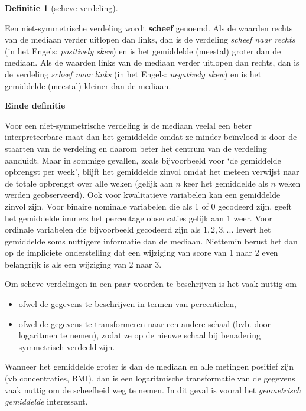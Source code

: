 \documentclass[
  12pt,dutch,coursenotes]{book}
\providecommand{\tightlist}{%
  \setlength{\itemsep}{0pt}\setlength{\parskip}{0pt}}
\theoremstyle{definition}
\newtheorem{definition}{Definitie}[chapter]
\theoremstyle{definition}
\theoremstyle{definition}
\theoremstyle{remark}
\begin{document}
\begin{definition}[scheve verdeling]
\protect\hypertarget{def:unnamed-chunk-98}{}{\label{def:unnamed-chunk-98} \iffalse (scheve verdeling) \fi{} }
\end{definition}
Een niet-symmetrische verdeling wordt \textbf{scheef} genoemd. Als de
waarden rechts van de mediaan verder uitlopen dan links, dan is de verdeling
\emph{scheef naar rechts} (in het Engels: \emph{positively skew}) en is
het gemiddelde (meestal) groter dan de mediaan. Als de waarden links van de
mediaan verder uitlopen dan rechts, dan is de verdeling \emph{scheef naar
links} (in het Engels: \emph{negatively skew}) en is het gemiddelde
(meestal) kleiner dan de mediaan.

\textbf{Einde definitie}

Voor een niet-symmetrische verdeling is de mediaan veelal een beter
interpreteerbare maat dan het gemiddelde omdat ze minder beïnvloed is
door de staarten van de verdeling en daarom beter het centrum van de
verdeling aanduidt. Maar in sommige gevallen, zoals bijvoorbeeld voor `de
gemiddelde opbrengst per week', blijft het gemiddelde zinvol omdat het
meteen verwijst naar de totale opbrengst over alle weken (gelijk aan \(n\)
keer het gemiddelde als \(n\) weken werden geobserveerd). Ook voor
kwalitatieve variabelen kan een gemiddelde zinvol zijn. Voor binaire
nominale variabelen die als 1 of 0 gecodeerd zijn, geeft het gemiddelde
immers het percentage observaties gelijk aan 1 weer. Voor ordinale
variabelen die bijvoorbeeld gecodeerd zijn als \(1, 2, 3, ...\) levert het
gemiddelde soms nuttigere informatie dan de mediaan. Niettemin berust het
dan op de impliciete onderstelling dat een wijziging van score van 1 naar 2
even belangrijk is als een wijziging van 2 naar 3.

Om scheve verdelingen in een paar woorden te beschrijven is het vaak nuttig
om

\begin{itemize}
\tightlist
\item
  ofwel de gegevens te beschrijven in termen van percentielen,
\item
  ofwel de gegevens te transformeren naar een andere schaal (bvb. door
  logaritmen te nemen), zodat ze op de nieuwe schaal bij benadering
  symmetrisch verdeeld zijn.
\end{itemize}

Wanneer het gemiddelde groter is dan de mediaan en alle metingen positief zijn (vb concentraties, BMI), dan is een logaritmische
transformatie van de gegevens vaak nuttig om de scheefheid weg te nemen. In
dit geval is vooral het \emph{geometrisch gemiddelde} interessant.
\end{document}
